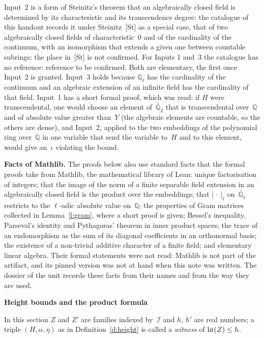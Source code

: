 \documentclass[11pt,a4paper]{article}
\newcommand{\kw}[1]{\emph{#1}}
\newcommand{\m}[1]{\mbox{$#1$}}        %
\newcommand{\sect}[2]{\refstepcounter{section}\label{#2}\par\addvspace{19pt plus 4pt minus 2pt}\Needspace{7\baselineskip}%
  \noindent\llap{{\fontsize{13.2}{16}\selectfont\bfseries\color{inkfaint}\thesection}\hspace{9pt}}%
  {\fontsize{13.2}{16}\selectfont\bfseries\color{ink}#1}\par\nopagebreak\vspace{-1pt}}
\newcommand{\subhead}[1]{\par\addvspace{9pt plus 2pt}\Needspace{4\baselineskip}\noindent\textbf{#1}\enspace\ignorespaces}
\theoremstyle{plainx}
\theoremstyle{uprightx}
\newcommand{\QQ}{\mathbb{Q}}
\newcommand{\Ql}{\mathbb{Q}_\ell}
\newcommand{\Qlb}{\bar{\mathbb{Q}}_\ell}
\newcommand{\IX}{\mathcal{I}}
\newcommand{\abs}[1]{\lvert #1\rvert}
\begin{document}
Input~2 is a form of Steinitz's theorem that an algebraically closed field is determined by its characteristic
and its transcendence degree: the catalogue of this handout records it under Steinitz~[St] as a special
case, that of two algebraically closed fields of characteristic~$0$ and of the cardinality of the continuum, with
an isomorphism that extends a given one between countable subrings; the place in~[St] is not confirmed.
For Inputs 1 and~3 the catalogue has no reference: reference to be confirmed. Both are elementary, the first
once Input~2 is granted. Input~3 holds because $\Ql$ has the cardinality of the continuum and an algebraic extension of an infinite
field has the cardinality of that field. Input~1 has a short formal proof, which was read: if $H$ were
transcendental, one would choose an element of~$\bar{\QQ}_2$ that is transcendental over~$\QQ$ and of absolute
value greater than~$Y$ (the algebraic elements are countable, so the others are dense), and Input~2, applied to
the two embeddings of the polynomial ring over~$\QQ$ in one variable that send the variable to~$H$ and to this
element, would give an~$\iota$ violating the bound.

\subhead{Facts of Mathlib.} The proofs below also use standard facts that the formal proofs take from Mathlib, the
mathematical library of Lean: unique factorisation of integers; that the image of the norm of a finite separable
field extension in an algebraically closed field is the product over the embeddings; that $\abs{\,\cdot\,}_\ell$
on~$\Qlb$ restricts to the $\ell$-adic absolute value on~$\QQ$; the properties of Gram matrices collected in
Lemma~\ref{l:gram}, where a short proof is given; Bessel's inequality, Parseval's identity and Pythagoras' theorem
in inner product spaces; the trace of an endomorphism as the sum of its diagonal coefficients in an orthonormal
basis; the existence of a non-trivial additive character of a finite field; and elementary linear algebra. Their
formal statements were not read: Mathlib is not part of the artifact, and its pinned version was not at hand when
this note was written. The dossier of the unit records these facts from their names and from the way they are
used.

\sect{Height bounds and the product formula}{s:heights}
In this section $Z$ and $Z'$ are families indexed by~$\IX$ and $h$, $h'$ are real numbers; a triple
$(H,\alpha,\eta)$ as in Definition~\ref{d:height} is called a \kw{witness} of \m{\hle{h}{Z}}.
\end{document}
